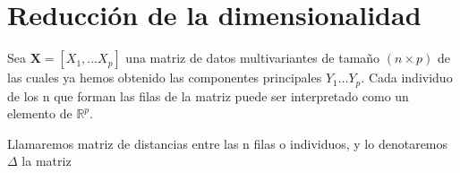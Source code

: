 \section{Reducción de la dimensionalidad}

\noindent Sea $\textbf{X}=[X_1,\ldots X_p]$ una matriz de datos multivariantes de tamaño $(n\times p)$ de las cuales ya hemos obtenido las componentes principales $Y_1 \ldots Y_p $. Cada individuo de los n que forman las filas de la matriz puede ser interpretado como un elemento de $\mathbb{R}^p$. 

\begin{defi}
Llamaremos matriz de distancias entre las n filas o individuos, y lo denotaremos $\Delta$ la matriz  
\end{defi}

